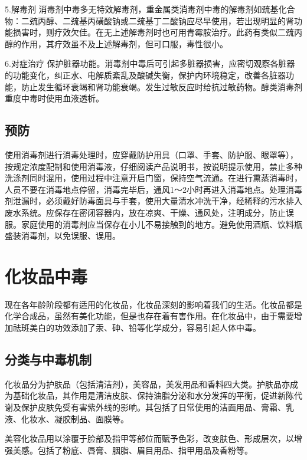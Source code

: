 5.解毒剂
消毒剂中毒多无特效解毒剂，重金属类消毒剂中毒的解毒剂如巯基化合物：二巯丙醇、二巯基丙磺酸钠或二巯基丁二酸钠应尽早使用，若出现明显的肾功能损害时，则疗效欠佳。在无上述解毒剂时也可用青霉胺治疗。此药有类似二巯丙醇的作用，其疗效虽不及上述解毒剂，但可口服，毒性很小。

6.对症治疗
保护脏器功能。消毒剂中毒后可引起多脏器损害，应密切观察各脏器的功能变化，纠正水、电解质紊乱及酸碱失衡，保护内环境稳定，改善各脏器功能，防止发生循环衰竭和肾功能衰竭。发生过敏反应时给抗过敏药物。醇类消毒剂重度中毒时使用血液透析。

\subsection{预防}

使用消毒剂进行消毒处理时，应穿戴防护用具（口罩、手套、防护服、眼罩等），按规定浓度配制和使用消毒液，仔细阅读产品说明书，按说明提示使用，禁止多种洗涤剂同时混用，使用过程中注意开启门窗，保持空气流通。在进行熏蒸消毒时，人员不要在消毒地点停留，消毒完毕后，通风1～2小时再进入消毒地点。处理消毒剂泄漏时，必须戴好防毒面具与手套，使用大量清水冲洗干净，经稀释的污水排入废水系统。应保存在密闭容器内，放在凉爽、干燥、通风处，注明成分，防止误服。家庭使用的消毒剂应当保存在小儿不易接触到的地方。避免使用酒瓶、饮料瓶盛装消毒剂，以免误服、误用。

\protect\hypertarget{text00189.html}{}{}

\section{化妆品中毒}

现在各年龄阶段都有适用的化妆品，化妆品深刻的影响着我们的生活。化妆品都是化学合成品，虽然有美化功能，但是也存在着有害作用。在化妆品中，由于需要增加祛斑美白的功效添加了汞、砷、铅等化学成分，容易引起人体中毒。

\subsection{分类与中毒机制}

化妆品分为护肤品（包括清洁剂），美容品，美发用品和香料四大类。护肤品亦成为基础化妆品，其作用是清洁皮肤、保持油脂分泌和水分发挥的平衡，促进新陈代谢及保护皮肤免受有害紫外线的影响。其包括了日常使用的洁面用品、膏霜、乳液、化妆水、凝胶制品、面膜等。

美容化妆品用以涂覆于脸部及指甲等部位而赋予色彩，改变肤色、形成层次，以增强美感。包括了粉底、唇膏、胭脂、眉目用品、指甲用品及香粉等。

